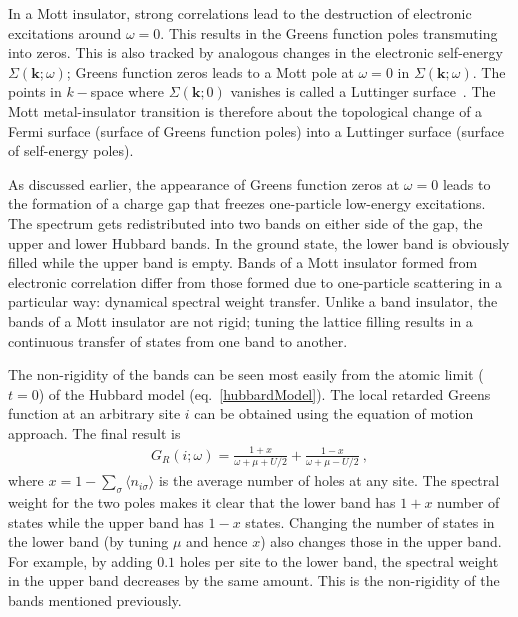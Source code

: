 In a Mott insulator, strong correlations lead to the destruction of electronic excitations around \(\omega=0\). This results in the Greens function poles transmuting into zeros. This is also tracked by analogous changes in the electronic self-energy \(\Sigma({\bm k};\omega)\); Greens function zeros leads to a Mott pole at \(\omega=0\) in \(\Sigma({\bm k};\omega)\). The points in \(k-\)space where \(\Sigma({\bm k};0)\) vanishes is called a Luttinger surface~\cite{dzyaloshinskii2003some}. The Mott metal-insulator transition is therefore about the topological change of a Fermi surface (surface of Greens function poles) into a Luttinger surface (surface of self-energy poles).

As discussed earlier, the appearance of Greens function zeros at \(\omega=0\) leads to the formation of a charge gap that freezes one-particle low-energy excitations. The spectrum gets redistributed into two bands on either side of the gap, the upper and lower Hubbard bands. In the ground state, the lower band is obviously filled while the upper band is empty. Bands of a Mott insulator formed from electronic correlation differ from those formed due to one-particle scattering in a particular way: dynamical spectral weight transfer. Unlike a band insulator, the bands of a Mott insulator are not rigid; tuning the lattice filling results in a continuous transfer of states from one band to another. 

The non-rigidity of the bands can be seen most easily from the atomic limit (\(t=0\)) of the Hubbard model (eq.~\ref{hubbardModel}). The local retarded Greens function at an arbitrary site \(i\) can be obtained using the equation of motion approach. The final result is~\cite{phillips2012advanced}
\begin{equation}\begin{aligned}
G_R(i; \omega) = \frac{1 + x}{\omega + \mu + U/2} + \frac{1 - x}{\omega + \mu - U/2}~,
\end{aligned}\end{equation}
where \(x = 1 - \sum_\sigma\langle n_{i\sigma} \rangle \) is the average number of holes at any site. The spectral weight for the two poles makes it clear that the lower band has \(1+x\) number of states while the upper band has \(1-x\) states. Changing the number of states in the lower band (by tuning \(\mu\) and hence \(x\)) also changes those in the upper band. For example, by adding \(0.1\) holes per site to the lower band, the spectral weight in the upper band decreases by the same amount. This is the non-rigidity of the bands mentioned previously.


